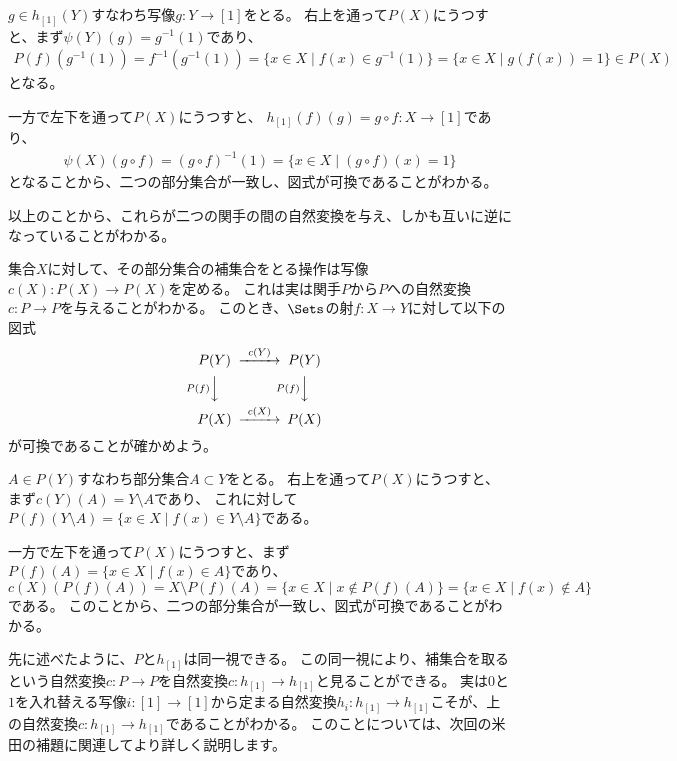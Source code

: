 \documentclass[uplatex]{jsarticle}
\begin{document}
$g \in h_{[1]}(Y)$すなわち写像$g:Y \to [1]$をとる。
右上を通って$P(X)$にうつすと、まず$\psi(Y)(g)=g^{-1}(1)$であり、
\begin{align*}
P(f)(g^{-1}(1))=f^{-1}(g^{-1}(1))=\{x \in X \mid f(x) \in g^{-1}(1)\}=\{x \in X \mid g(f(x))=1\} \in P(X)
\end{align*}
となる。

一方で左下を通って$P(X)$にうつすと、
$h_{[1]}(f)(g)=g\circ f:X \to [1]$であり、
\begin{align*}
\psi(X)(g\circ f)=(g\circ f)^{-1}(1)=\{x \in X \mid (g\circ f)(x) = 1\}
\end{align*}
となることから、二つの部分集合が一致し、図式が可換であることがわかる。

\vspace{5pt}

以上のことから、これらが二つの関手の間の自然変換を与え、しかも互いに逆になっていることがわかる。

\vspace{10pt}
集合$X$に対して、その部分集合の補集合をとる操作は写像$c(X):P(X)\to P(X)$を定める。
これは実は関手$P$から$P$への自然変換$c:P \to P$を与えることがわかる。
このとき、$\Sets$の射$f:X \to Y$に対して以下の図式
\begin{align*}
\begin{CD}
P(Y)@>c(Y)>>P(Y)\\
@VP(f)VV@VP(f)VV\\
P(X)@>c(X)>>P(X)
\end{CD}
\end{align*}
が可換であることが確かめよう。

$A \in P(Y)$すなわち部分集合$A\subset Y$をとる。
右上を通って$P(X)$にうつすと、まず$c(Y)(A)=Y \setminus A$であり、
これに対して$P(f)(Y\setminus A)=\{x \in X \mid f(x) \in Y \setminus A\}$である。

一方で左下を通って$P(X)$にうつすと、まず$P(f)(A)=\{x \in X \mid f(x) \in A\}$であり、
$c(X)(P(f)(A))=X \setminus P(f)(A)=\{x \in X \mid x \notin P(f)(A)\}=\{x \in X \mid f(x) \notin A\} $である。
このことから、二つの部分集合が一致し、図式が可換であることがわかる。

\vspace{10pt}
先に述べたように、$P$と$h_{[1]}$は同一視できる。
この同一視により、補集合を取るという自然変換$c:P \to P$を自然変換$c:h_{[1]} \to h_{[1]}$と見ることができる。
実は$0$と$1$を入れ替える写像$i:[1] \to [1]$から定まる自然変換$h_i:h_{[1]} \to h_{[1]}$こそが、上の自然変換$c:h_{[1]} \to h_{[1]}$であることがわかる。
このことについては、次回の米田の補題に関連してより詳しく説明します。
\end{document}
